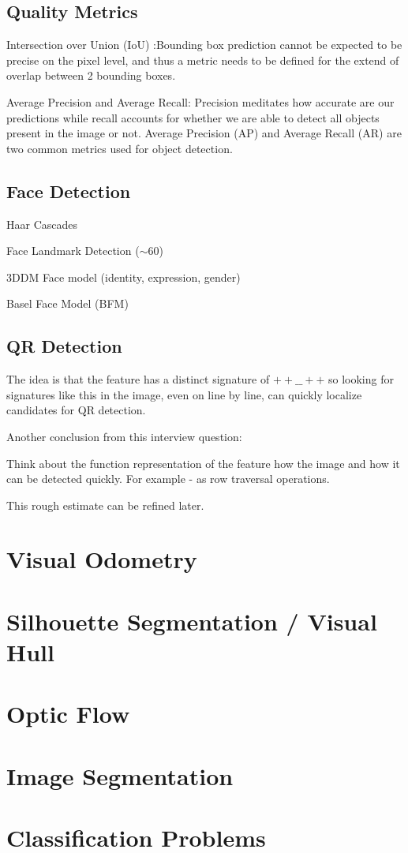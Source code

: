 \subsection{Quality Metrics}

Intersection over Union (IoU) :Bounding box prediction cannot be expected to be precise on the pixel level, and thus a metric needs to be defined for the extend of overlap between 2 bounding boxes.

Average Precision and Average Recall: Precision meditates how accurate are our predictions while recall accounts for whether we are able to detect all objects present in the image or not. Average Precision (AP) and Average Recall (AR) are two common metrics used for object detection.

\subsection{Face Detection}

Haar Cascades

Face Landmark Detection ($\sim 60$)

3DDM Face model (identity, expression, gender)

Basel Face Model (BFM)

\subsection{QR Detection}

The idea is that the feature has a distinct signature of $++\_\_++$ so looking for signatures like this in the image, even on line by line, can quickly localize candidates for QR detection. 

Another conclusion from this interview question: 

Think about the function representation of the feature how the image and how it can be detected quickly. For example - as row traversal operations.

This rough estimate can be refined later.

\section{Visual Odometry}

\section{Silhouette Segmentation / Visual Hull}

\section{Optic Flow}

\section{Image Segmentation}

\section{Classification Problems}

